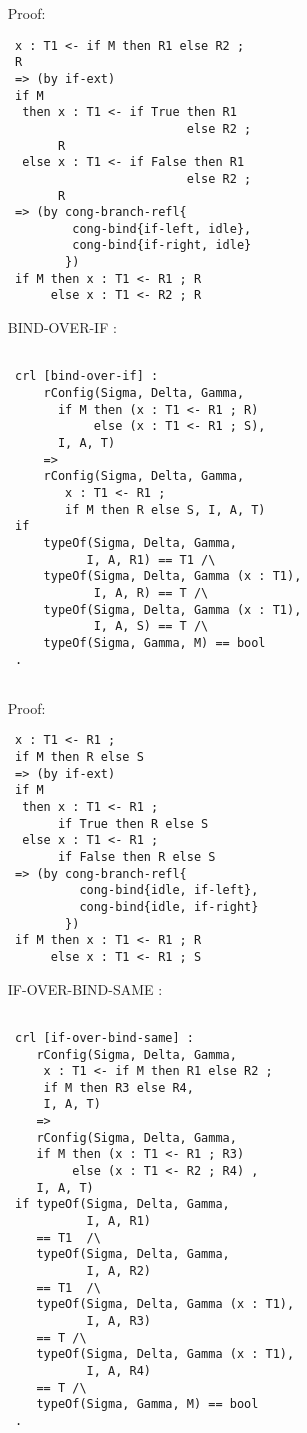 \documentclass{article}
\begin{document}
\begin{itemize}
\begin{lstlisting}
\end{lstlisting} 

Proof:
\begin{lstlisting}
 x : T1 <- if M then R1 else R2 ; 
 R 
 => (by if-ext)
 if M 
  then x : T1 <- if True then R1 
                         else R2 ; 
       R
  else x : T1 <- if False then R1 
                         else R2 ; 
       R     
 => (by cong-branch-refl{
         cong-bind{if-left, idle}, 
         cong-bind{if-right, idle}
        })
 if M then x : T1 <- R1 ; R
      else x : T1 <- R2 ; R
\end{lstlisting}   
  
\item[BIND-OVER-IF]:
\begin{lstlisting}    
      
 crl [bind-over-if] : 
     rConfig(Sigma, Delta, Gamma, 
       if M then (x : T1 <- R1 ; R) 
            else (x : T1 <- R1 ; S), 
       I, A, T)
     =>        
     rConfig(Sigma, Delta, Gamma, 
        x : T1 <- R1 ; 
        if M then R else S, I, A, T)
 if
     typeOf(Sigma, Delta, Gamma, 
           I, A, R1) == T1 /\
     typeOf(Sigma, Delta, Gamma (x : T1), 
            I, A, R) == T /\
     typeOf(Sigma, Delta, Gamma (x : T1), 
            I, A, S) == T /\
     typeOf(Sigma, Gamma, M) == bool 
 .
 
\end{lstlisting}  

Proof:
\begin{lstlisting}
 x : T1 <- R1 ;
 if M then R else S
 => (by if-ext)
 if M 
  then x : T1 <- R1 ; 
       if True then R else S
  else x : T1 <- R1 ; 
       if False then R else S
 => (by cong-branch-refl{
          cong-bind{idle, if-left}, 
          cong-bind{idle, if-right}
        })
 if M then x : T1 <- R1 ; R
      else x : T1 <- R1 ; S
\end{lstlisting} 


\item[IF-OVER-BIND-SAME]:
\begin{lstlisting}  
           
 crl [if-over-bind-same] :
    rConfig(Sigma, Delta, Gamma, 
     x : T1 <- if M then R1 else R2 ; 
     if M then R3 else R4, 
     I, A, T)
    =>
    rConfig(Sigma, Delta, Gamma, 
    if M then (x : T1 <- R1 ; R3) 
         else (x : T1 <- R2 ; R4) , 
    I, A, T)                   
 if typeOf(Sigma, Delta, Gamma, 
           I, A, R1) 
    == T1  /\
    typeOf(Sigma, Delta, Gamma, 
           I, A, R2) 
    == T1  /\
    typeOf(Sigma, Delta, Gamma (x : T1), 
           I, A, R3) 
    == T /\
    typeOf(Sigma, Delta, Gamma (x : T1), 
           I, A, R4) 
    == T /\
    typeOf(Sigma, Gamma, M) == bool 
 .


\end{lstlisting}
\end{itemize}
\end{document}

